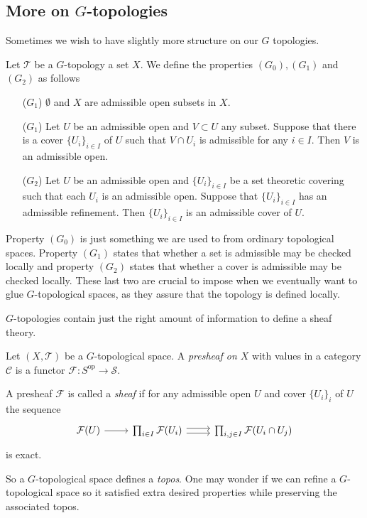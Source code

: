 \subsection{More on $G$-topologies} \label{sec:more_on_Gtopologies}
Sometimes we wish to have slightly more structure on our $G$ topologies.
\begin{definition}
	Let $\mathcal{T} $ be a $G$-topology a set $X$. 
	We define the properties $(G_0), (G_1)$ and $(G_2)$ as follows 
	\begin{enumerate}
	\item[($G_1$)] $\emptyset$ and $X$ are admissible open subsets in $X$.  
	\item [($G_1$)] Let  $U$ be an admissible open and $V \subset  U$ any subset. 
		Suppose that there is a cover $\{U_i\} _{i \in I} $ of $U$ such that $V \cap U_i$ is admissible for any $i \in I$. 
		Then $V$ is an admissible open. 
	\item[($G_2$)]
		Let $U$ be an admissible open and  $\{U_{i}\}_{i \in I}$ be a set theoretic covering such that each $U_i$ is an admissible open. 
		Suppose that $\{U_i\}  _{i \in I}$ has an admissible refinement. Then $\{U_{i}\} _{i \in I}$ is an admissible cover of $U$. 
	\end{enumerate}
\end{definition}

Property $(G_0)$ is just something we are used to from ordinary topological spaces. 
Property $(G_1)$ states that whether a set is admissible may be checked locally and property $(G_2)$ states that whether a cover is admissible may be checked locally. 
These last two are crucial to impose when we eventually want to glue  $G$-topological spaces, as they assure that the topology is defined locally. 

$G$-topologies contain just the right amount of information to define a sheaf theory. 
\begin{definition}
	Let $(X, \mathcal{T} )$ be a $G$-topological space.
	A \emph{presheaf on $X$} with values in a category $\mathcal{C} $ is a functor $\mathcal{F} :S^{\text{op}} \to \mathcal{S} $. 

	A presheaf $\mathcal{F} $ is called a \emph{sheaf} if for any admissible open  $U$ and cover $\{U_i\}_i $ of $U$ the sequence \[
	\begin{tikzcd}
		\mathcal{F} (U) \rar & \prod_{i \in I} \mathcal{F} (U_i) \rar[shift left]\rar[shift right] & \prod_{i, j \in I} \mathcal{F} (U_{i} \cap U_j)
	\end{tikzcd}
	\] 
	is exact. 
\end{definition}
So a $G$-topological space defines a \emph{topos}. 
One may wonder if we can refine a $G$-topological space so it satisfied extra desired properties while preserving the associated topos. 

